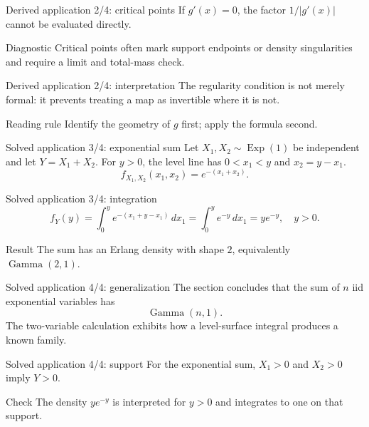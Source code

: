 \documentclass[10pt,aspectratio=169]{beamer}
\begin{document}
\begin{frame}{Derived application 2/4: critical points}
  \footnotesize
  If $g'(x)=0$, the factor $1/|g'(x)|$ cannot be evaluated directly.
  \begin{alertblock}{Diagnostic}
    Critical points often mark support endpoints or density singularities and
    require a limit and total-mass check.
  \end{alertblock}
\end{frame}

\begin{frame}{Derived application 2/4: interpretation}
  \footnotesize
  The regularity condition is not merely formal: it prevents treating a map as
  invertible where it is not.
  \begin{exampleblock}{Reading rule}
    Identify the geometry of $g$ first; apply the formula second.
  \end{exampleblock}
\end{frame}

\begin{frame}{Solved application 3/4: exponential sum}
  \footnotesize
  Let $X_1,X_2\sim\operatorname{Exp}(1)$ be independent and let
  $Y=X_1+X_2$. For $y>0$, the level line has $0<x_1<y$ and $x_2=y-x_1$.
  \[
    f_{X_1,X_2}(x_1,x_2)=e^{-(x_1+x_2)}.
  \]
\end{frame}

\begin{frame}{Solved application 3/4: integration}
  \footnotesize
  \[
    f_Y(y)=\int_0^y e^{-(x_1+y-x_1)}\,dx_1
    =\int_0^y e^{-y}\,dx_1=ye^{-y},\quad y>0.
  \]
  \begin{alertblock}{Result}
    The sum has an Erlang density with shape $2$, equivalently
    $\operatorname{Gamma}(2,1)$.
  \end{alertblock}
\end{frame}

\begin{frame}{Solved application 4/4: generalization}
  \footnotesize
  The section concludes that the sum of $n$ iid exponential variables has
  \[
    \operatorname{Gamma}(n,1).
  \]
  The two-variable calculation exhibits how a level-surface integral produces a
  known family.
\end{frame}

\begin{frame}{Solved application 4/4: support}
  \footnotesize
  For the exponential sum, $X_1>0$ and $X_2>0$ imply $Y>0$.
  \begin{exampleblock}{Check}
    The density $ye^{-y}$ is interpreted for $y>0$ and integrates to one on
    that support.
  \end{exampleblock}
\end{frame}
\end{document}
